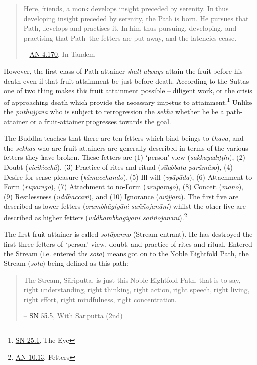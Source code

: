 \begin{quote}
Here, friends, a monk develops insight preceded by serenity. In thus developing insight preceded by serenity, the Path is born. He pursues that Path, develops and practises it. In him thus pursuing, developing, and practising that Path, the fetters are put away, and the latencies cease.

 -- \href{https://suttacentral.net/an4.170/en/thanissaro}{AN 4.170}, In Tandem
\end{quote}

However, the first class of Path-attainer \emph{shall always} attain the fruit before his death even if that fruit-attainment be just before death. According to the Suttas one of two thing makes this fruit attainment possible -- diligent work, or the crisis of approaching death which provide the necessary impetus to attainment.\footnote{\href{https://suttacentral.net/sn25.1/en/sujato}{SN 25.1}, The Eye} Unlike the \textit{puthujjana} who is subject to retrogression the \textit{sekha} whether he be a path-attainer or a fruit-attainer progresses towards the goal.

The Buddha teaches that there are ten fetters which bind beings to \textit{bhava}, and the \textit{sekhas} who are fruit-attainers are generally described in terms of the various fetters they have broken. These fetters are (1) `person'-view (\textit{sakkāyadiṭṭhi}), (2) Doubt (\textit{vicikicchā}), (3) Practice of rites and ritual (\textit{sīlabbata-parāmāso}), (4) Desire for sense-pleasure (\textit{kāmacchando}), (5) Ill-will (\textit{vyāpāda}), (6) Attachment to Form (\textit{rūparāgo}), (7) Attachment to no-Form (\textit{arūparāgo}), (8) Conceit (\textit{māno}), (9) Restlessness (\textit{uddhaccaṁ}), and (10) Ignorance (\textit{avijjāṁ}). The first five are described as lower fetters (\textit{orambhāgiyāni saññojanāni}) whilst the other five are described as higher fetters (\textit{uddhambhāgiyāni saññojanāni}).\footnote{\href{https://suttacentral.net/an10.13/en/bodhi}{AN 10.13}, Fetters}

The first fruit-attainer is called \textit{sotāpanno} (Stream-entrant). He has destroyed the first three fetters of `person'-view, doubt, and practice of rites and ritual. Entered the Stream (i.e. entered the \textit{sota}) means got on to the Noble Eightfold Path, the Stream (\textit{sota}) being defined as this path:

\begin{quote}
The Stream, Sāriputta, is just this Noble Eightfold Path, that is to say, right understanding, right thinking, right action, right speech, right living, right effort, right mindfulness, right concentration.

 -- \href{https://suttacentral.net/sn55.5/en/sujato}{SN 55.5}, With Sāriputta (2nd)
\end{quote}

